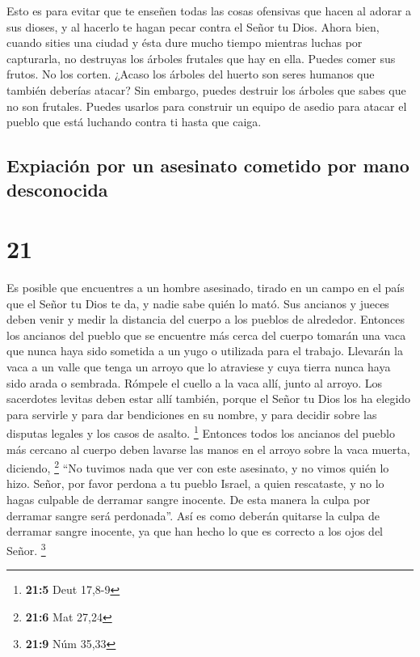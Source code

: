  Esto es para evitar que te enseñen todas las cosas
ofensivas que hacen al adorar a sus dioses, y al hacerlo te hagan pecar
contra el Señor tu Dios.  Ahora bien, cuando sities una
ciudad y ésta dure mucho tiempo mientras luchas por capturarla, no
destruyas los árboles frutales que hay en ella. Puedes comer sus frutos.
No los corten. ¿Acaso los árboles del huerto son seres humanos que
también deberías atacar?  Sin embargo, puedes destruir
los árboles que sabes que no son frutales. Puedes usarlos para construir
un equipo de asedio para atacar el pueblo que está luchando contra ti
hasta que caiga.

\hypertarget{expiaciuxf3n-por-un-asesinato-cometido-por-mano-desconocida}{%
\subsection{Expiación por un asesinato cometido por mano
desconocida}\label{expiaciuxf3n-por-un-asesinato-cometido-por-mano-desconocida}}

\hypertarget{section-20}{%
\section{21}\label{section-20}}

 Es posible que encuentres a un hombre asesinado, tirado
en un campo en el país que el Señor tu Dios te da, y nadie sabe quién lo
mató.  Sus ancianos y jueces deben venir y medir la
distancia del cuerpo a los pueblos de alrededor.  Entonces
los ancianos del pueblo que se encuentre más cerca del cuerpo tomarán
una vaca que nunca haya sido sometida a un yugo o utilizada para el
trabajo.  Llevarán la vaca a un valle que tenga un arroyo
que lo atraviese y cuya tierra nunca haya sido arada o sembrada. Rómpele
el cuello a la vaca allí, junto al arroyo.  Los sacerdotes
levitas deben estar allí también, porque el Señor tu Dios los ha elegido
para servirle y para dar bendiciones en su nombre, y para decidir sobre
las disputas legales y los casos de asalto. \footnote{\textbf{21:5} Deut
  17,8-9}  Entonces todos los ancianos del pueblo más
cercano al cuerpo deben lavarse las manos en el arroyo sobre la vaca
muerta, diciendo, \footnote{\textbf{21:6} Mat 27,24}  ``No
tuvimos nada que ver con este asesinato, y no vimos quién lo hizo.
 Señor, por favor perdona a tu pueblo Israel, a quien
rescataste, y no lo hagas culpable de derramar sangre inocente. De esta
manera la culpa por derramar sangre será perdonada''.  Así
es como deberán quitarse la culpa de derramar sangre inocente, ya que
han hecho lo que es correcto a los ojos del Señor. \footnote{\textbf{21:9}
  Núm 35,33}


